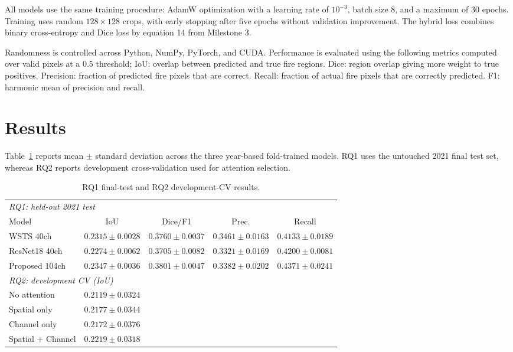 \documentclass[sigconf]{acmart}
\begin{document}
All models use the same training procedure: AdamW optimization with a learning rate of $10^{-3}$, batch size 8, and a maximum of 
30 epochs. Training uses random $128\times128$ crops, with early stopping after five epochs without validation improvement. 
The hybrid loss combines binary cross-entropy and Dice loss by equation 14 from Milestone 3.

Randomness is controlled across Python, NumPy, PyTorch, and CUDA. Performance is evaluated using the following metrics computed 
over valid pixels at a 0.5 threshold; IoU: overlap between predicted and true fire regions. Dice: region overlap giving more 
weight to true positives. Precision: fraction of predicted fire pixels that are correct. Recall: fraction of actual fire pixels that are correctly predicted. 
F1: harmonic mean of precision and recall.

\section{Results}
Table~\ref{tab:results} reports mean $\pm$ standard deviation across the three year-based
fold-trained models. RQ1 uses the untouched 2021 final test set, whereas RQ2 reports development
cross-validation used for attention selection.

\begin{table}[t]
\centering
\caption{RQ1 final-test and RQ2 development-CV results.}
\label{tab:results}
\scriptsize
\setlength{\tabcolsep}{2.1pt}
\begin{tabular}{lcccc}
\toprule
\multicolumn{5}{l}{\textit{RQ1: held-out 2021 test}}\\
Model & IoU & Dice/F1 & Prec. & Recall \\
\midrule
WSTS 40ch &
$0.2315{\pm}0.0028$ &
$0.3760{\pm}0.0037$ &
$\mathbf{0.3461}{\pm}0.0163$ &
$0.4133{\pm}0.0189$ \\
ResNet18 40ch &
$0.2274{\pm}0.0062$ &
$0.3705{\pm}0.0082$ &
$0.3321{\pm}0.0169$ &
$0.4200{\pm}0.0081$ \\
Proposed 104ch &
$\mathbf{0.2347}{\pm}0.0036$ &
$\mathbf{0.3801}{\pm}0.0047$ &
$0.3382{\pm}0.0202$ &
$\mathbf{0.4371}{\pm}0.0241$ \\
\midrule
\multicolumn{5}{l}{\textit{RQ2: development CV (IoU)}}\\
No attention &
$0.2119{\pm}0.0324$ & & & \\
Spatial only &
$0.2177{\pm}0.0344$ & & & \\
Channel only &
$0.2172{\pm}0.0376$ & & & \\
Spatial + Channel &
$\mathbf{0.2219}{\pm}0.0318$ & & & \\
\bottomrule
\end{tabular}
\end{table}
\end{document}
